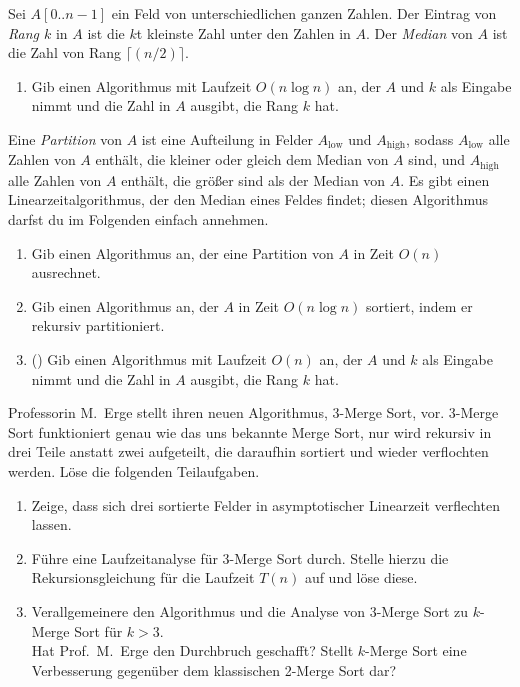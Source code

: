 \documentclass{uebung_cs}
\begin{document}
\begin{aufgabe}
Sei $A[0..n-1]$ ein Feld von unterschiedlichen ganzen Zahlen.
Der Eintrag von \emph{Rang $k$} in $A$ ist die $k$t kleinste Zahl unter den Zahlen in $A$.
Der \emph{Median} von $A$ ist die Zahl von Rang $\lceil(n/2)\rceil$.
\begin{enumerate}
	\item \mittel Gib einen Algorithmus mit Laufzeit $O(n\log n)$ an, der $A$ und $k$ als Eingabe nimmt und die Zahl in $A$ ausgibt, die Rang $k$ hat.
\end{enumerate}
Eine \emph{Partition} von $A$ ist eine Aufteilung in Felder $A_{\text{low}}$ und $A_{\text{high}}$, sodass $A_{\text{low}}$ alle Zahlen von $A$ enthält, die kleiner oder gleich dem Median von $A$ sind, und $A_{\text{high}}$ alle Zahlen von $A$ enthält, die größer sind als der Median von $A$.
Es gibt einen Linearzeitalgorithmus, der den Median eines Feldes findet; diesen Algorithmus darfst du im Folgenden einfach annehmen.
\begin{enumerate}[resume]
	\item \bestehen Gib einen Algorithmus an, der eine Partition von $A$ in Zeit $O(n)$ ausrechnet.
	\item \note %
  Gib einen Algorithmus an, der $A$ in Zeit $O(n\log n)$ sortiert, indem er rekursiv partitioniert.
	\item \note (\veryhard) Gib einen Algorithmus mit Laufzeit $O(n)$ an, der $A$ und $k$ als Eingabe nimmt und die Zahl in $A$ ausgibt, die Rang $k$ hat.
\end{enumerate}
\end{aufgabe}


\begin{aufgabe}
	Professorin M.\ Erge stellt ihren neuen Algorithmus, 3-Merge Sort, vor.
	3-Merge Sort funktioniert genau wie das uns bekannte Merge Sort, nur wird rekursiv in drei Teile anstatt zwei aufgeteilt, die daraufhin sortiert und wieder verflochten werden.
	Löse die folgenden Teilaufgaben.
	\begin{enumerate}
		\item \mittel Zeige, dass sich drei sortierte Felder in asymptotischer Linearzeit verflechten lassen.
		\item \bestehen Führe eine Laufzeitanalyse für 3-Merge Sort durch. Stelle hierzu die Rekursionsgleichung für die Laufzeit $T(n)$ auf und löse diese.
		\item \note %
    Verallgemeinere den Algorithmus und die Analyse von 3-Merge Sort zu $k$-Merge Sort für $k>3$.\\
		Hat Prof.\ M.\ Erge den Durchbruch geschafft?
		Stellt $k$-Merge Sort eine Verbesserung gegenüber dem klassischen 2-Merge Sort dar?
	\end{enumerate}
\end{aufgabe}
\end{document}
